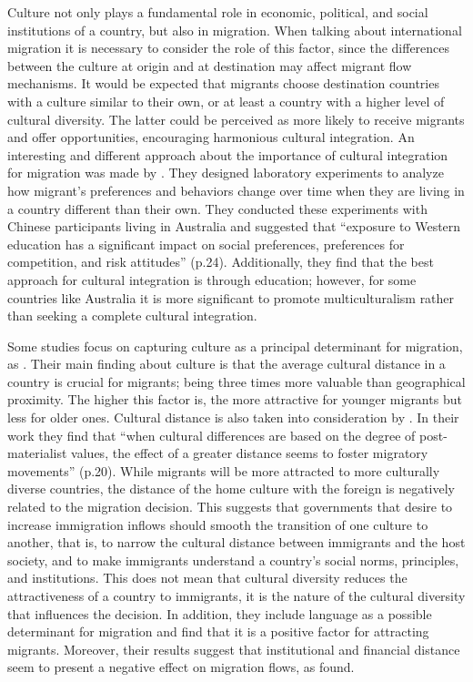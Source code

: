 \documentclass[../main.tex]{subfiles}
\begin{document}
Culture not only plays a fundamental role in economic, political, and social institutions of a country, but also in migration. When talking about international migration it is necessary to consider the role of this factor, since the differences between the culture at origin and at destination may affect migrant flow mechanisms. It would be expected that migrants choose destination countries with a culture similar to their own, or at least a country with a higher level of cultural diversity. The latter could be perceived as more likely to receive migrants and offer opportunities, encouraging harmonious cultural integration. An interesting and different approach about the importance of cultural integration for migration was made by \textcite{Cameron.2012}. They designed laboratory experiments to analyze how migrant’s preferences and behaviors change over time when they are living in a country different than their own. They conducted these experiments with Chinese participants living in Australia and suggested that \enquote{exposure to Western education has a significant impact on social preferences, preferences for competition, and risk attitudes} (p.24). Additionally, they find that the best approach for cultural integration is through education; however, for some countries like Australia it is more significant to promote multiculturalism rather than seeking a complete cultural integration. 

Some studies focus on capturing culture as a principal determinant for migration, as \textcite{Wang.2016}. Their main finding about culture is that the average cultural distance in a country is crucial for migrants; being three times more valuable than geographical proximity. The higher this factor is, the more attractive for younger migrants but less for older ones. Cultural distance is also taken into consideration by \textcite{Caragliu.2012}. In their work they find that \enquote{when cultural differences are based on the degree of post-materialist values, the effect of a greater distance seems to foster migratory movements} (p.20). While migrants will be more attracted to more culturally diverse countries, the distance of the home culture with the foreign is negatively related to the migration decision. This suggests that governments that desire to increase immigration inflows should smooth the transition of one culture to another, that is, to narrow the cultural distance between immigrants and the host society, and to make immigrants understand a country’s social norms, principles, and institutions. This does not mean that cultural diversity reduces the attractiveness of a country to immigrants, it is the nature of the cultural diversity that influences the decision. In addition, they include language as a possible determinant for migration and find that it is a positive factor for attracting migrants. Moreover, their results suggest that institutional and financial distance seem to present a negative effect on migration flows, as \textcite{Wang.2016} found. 
\end{document}
